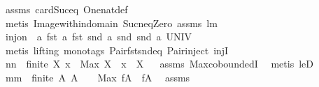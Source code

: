 \begin{isabellebody}
%
\isadelimproof
%
\endisadelimproof
%
\isatagproof
{}\isamarkupfalse%
\ assms\ card{\isacharunderscore}Suc{\isacharunderscore}eq\ One{\isacharunderscore}nat{\isacharunderscore}def\ \ \isamarkupfalse%
\ {\isacharparenleft}metis\ Image{\isacharunderscore}within{\isacharunderscore}domain{\isacharprime}\ Suc{\isacharunderscore}neq{\isacharunderscore}Zero\ assms\ lm{}{}{}{\isacharparenright}%
\endisatagproof
{\isafoldproof}%
%
\isadelimproof
\isanewline
%
\endisadelimproof
\isanewline
{}\isamarkupfalse%
\ {\isachardoublequoteopen}inj{\isacharunderscore}on\ \ {\isacharparenleft}{\isacharpercent}a{\isachardot}\ {\isacharparenleft}{\isacharparenleft}fst\ a{\isacharcomma}\ fst\ {\isacharparenleft}snd\ a{\isacharparenright}{\isacharparenright}{\isacharcomma}\ snd\ {\isacharparenleft}snd\ a{\isacharparenright}{\isacharparenright}{\isacharparenright}\ UNIV{\isachardoublequoteclose}\ \isanewline
%
\isadelimproof
%
\endisadelimproof
%
\isatagproof
{}\isamarkupfalse%
\ {\isacharparenleft}metis\ {\isacharparenleft}lifting{\isacharcomma}\ mono{\isacharunderscore}tags{\isacharparenright}\ Pair{\isacharunderscore}fst{\isacharunderscore}snd{\isacharunderscore}eq\ Pair{\isacharunderscore}inject\ injI{\isacharparenright}%
\endisatagproof
{\isafoldproof}%
%
\isadelimproof
\isanewline
%
\endisadelimproof
{}\isamarkupfalse%
\ nn{}{}{\isacharcolon}\ \ {\isachardoublequoteopen}finite\ X{\isachardoublequoteclose}\ {\isachardoublequoteopen}x\ {\isachargreater}\ Max\ X{\isachardoublequoteclose}\ \ {\isachardoublequoteopen}x\ {\isasymnotin}\ X{\isachardoublequoteclose}%
\isadelimproof
\ %
\endisadelimproof
%
\isatagproof
{}\isamarkupfalse%
\ assms\ Max{\isachardot}coboundedI\ \isamarkupfalse%
\ {\isacharparenleft}metis\ leD{\isacharparenright}%
\endisatagproof
{\isafoldproof}%
%
\isadelimproof
%
\endisadelimproof
\isanewline
\isanewline
{}\isamarkupfalse%
\ mm{}{}{\isacharcolon}\ \ {\isachardoublequoteopen}finite\ A{\isachardoublequoteclose}\ {\isachardoublequoteopen}A\ {\isasymnoteq}\ {\isacharbraceleft}{\isacharbraceright}{\isachardoublequoteclose}\ \ {\isachardoublequoteopen}Max\ {\isacharparenleft}f{\isacharbackquote}A{\isacharparenright}\ {\isasymin}\ f{\isacharbackquote}A{\isachardoublequoteclose}\ \isanewline
%
\isadelimproof
%
\endisadelimproof
%
\isatagproof
{}\isamarkupfalse%
\ assms\ \isamarkupfalse%

\end{isabellebody}
